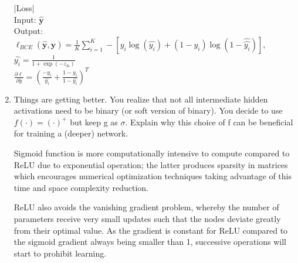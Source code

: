 \documentclass{article}
\begin{document}
\begin{enumerate}
      \begin{tcolorbox}
          |Loss|\\
          Input: $\bm{\hat{y}}$\\
          Output: $\ell_{BCE}(\bm{\hat{y},y})=\frac{1}{K}\sum_{i=1}^{K}-[y_i\log(\hat{y_i})+(1-y_i)\log(1-\hat{\hat{y_i}})],$\\
          $\hat{y_i}=\frac{1}{1+\exp(-z_{3i})}$\\
          $\frac{\partial \ell}{\partial \hat{y}}=(\frac{-y_i}{\hat{y_i}}+\frac{1-y_i}{1-\hat{y_i}})^T$
      \end{tcolorbox}
  \item Things are getting better. You realize that not all intermediate hidden activations need to be binary (or soft version of binary). You decide to use $f(\cdot)=(\cdot)^{+}$ but keep g as $\sigma$. Explain why this choice of f can be beneficial for training a (deeper) network.
      \begin{tcolorbox}
        Sigmoid function is more computationally intensive to compute compared to ReLU due to exponential operation; the latter produces sparsity in matrices which encourages numerical optimization techniques taking advantage of this time and space complexity reduction. 
      \end{tcolorbox}
      \begin{tcolorbox}
        ReLU also avoids the vanishing gradient problem, whereby the number of parameters receive very small updates such that the nodes deviate greatly from their optimal value. As the gradient is constant for ReLU compared to the sigmoid gradient always being smaller than 1, successive operations will start to prohibit learning.
      \end{tcolorbox}
\end{enumerate}
\end{document}

